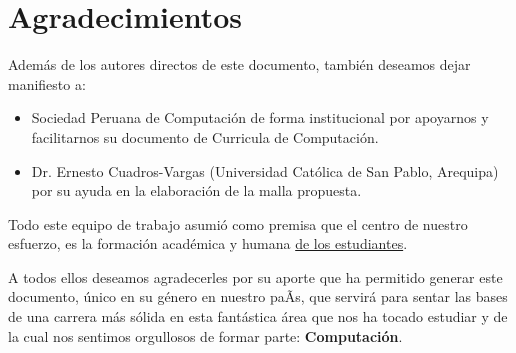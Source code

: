 \chapter*{Agradecimientos}\label{chap:cs-ack}
%

Además de los autores directos de este documento, también deseamos dejar manifiesto a:

\begin{itemize}
\item Sociedad Peruana de Computación de forma institucional por apoyarnos y facilitarnos su documento de Curricula de Computación.

\item Dr. Ernesto Cuadros-Vargas (Universidad Católica de San Pablo, Arequipa) por su ayuda en la elaboración de la malla propuesta. 
\end{itemize}

Todo este equipo de trabajo asumió como premisa que el centro de nuestro esfuerzo,
es la formación académica y humana \underline{de los estudiantes}.

A todos ellos deseamos agradecerles por su aporte que ha permitido generar 
este documento, único en su género en nuestro paÃ­s, que servirá para sentar las 
bases de una carrera más sólida en esta fantástica área que nos ha tocado estudiar y 
de la cual nos sentimos orgullosos de formar parte: \textbf{Computación}.
